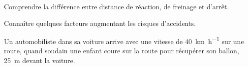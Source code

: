 \tetePremStssRout

\vspace*{-36pt}


\begin{objectifs}
  \item Comprendre la différence entre distance de réaction, de freinage et d'arrêt.
  \item Connaître quelques facteurs augmentant les risques d'accidents.
\end{objectifs}

\begin{contexte}
  Un automobiliste dans sa voiture arrive avec une vitesse de \qty{40}{\km\per\hour} sur une route, quand soudain une enfant coure sur la route pour récupérer son ballon, \qty{25}{\m} devant la voiture.
  
\end{contexte}


